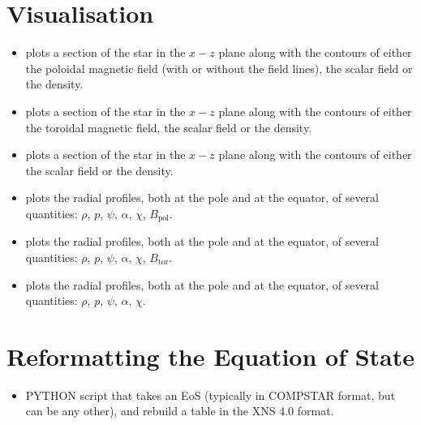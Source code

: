 \documentclass[letterpaper,10pt,english]{sphinxmanual}
\begin{document}
\section{Visualisation}
\label{\detokenize{files_outputs:visualisation}}\begin{itemize}
\item {} 
\sphinxAtStartPar
{} \sphinxhyphen{} plots a section of the star in the \(x-z\) plane along with the contours of either the poloidal magnetic field (with or without the field lines), the scalar field or the density.

\item {} 
\sphinxAtStartPar
{} \sphinxhyphen{} plots a section of the star in the \(x-z\) plane along with the contours of either the toroidal magnetic field, the scalar field or the density.

\item {} 
\sphinxAtStartPar
{} \sphinxhyphen{} plots a section of the star in the \(x-z\) plane along with the contours of either the scalar field or the density.

\item {} 
\sphinxAtStartPar
{} \sphinxhyphen{} plots the radial profiles, both at the pole and at the equator, of several quantities: \(\rho\), \(p\), \(\psi\), \(\alpha\), \(\chi\), \(B_\mathrm{pol}\).

\item {} 
\sphinxAtStartPar
{} \sphinxhyphen{} plots the radial profiles, both at the pole and at the equator, of several quantities: \(\rho\), \(p\), \(\psi\), \(\alpha\), \(\chi\), \(B_\mathrm{tor}\).

\item {} 
\sphinxAtStartPar
{} \sphinxhyphen{} plots the radial profiles, both at the pole and at the equator, of several quantities: \(\rho\), \(p\), \(\psi\), \(\alpha\), \(\chi\).

\end{itemize}


\section{Reformatting the Equation of State}
\label{\detokenize{files_outputs:reformatting-the-equation-of-state}}\begin{itemize}
\item {} 
\sphinxAtStartPar
{} \sphinxhyphen{} PYTHON script that takes an EoS (typically in COMPSTAR format, but can be any other), and rebuild a table in the XNS 4.0 format.

\end{itemize}
\end{document}
